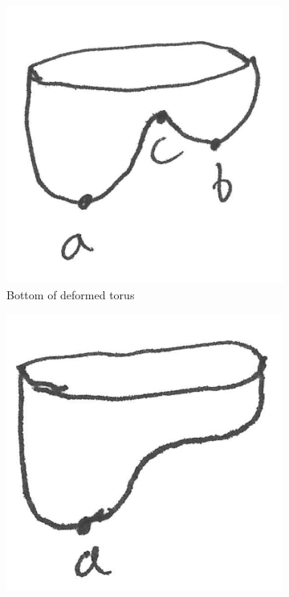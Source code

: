 \documentclass{article}
\begin{document}
\begin{figure}
	\centering
	\begin{subfigure}{0.24\columnwidth}
		\centering
		\includegraphics[width=\textwidth]{fig/blobby-torus-bottom}
		\caption{Bottom of deformed torus}
	\end{subfigure}
	\begin{subfigure}{0.24\columnwidth}
		\centering
		\includegraphics[width=\textwidth]{fig/blobby-torus-bottom-reduced1}

\end{subfigure}
\end{figure}
\end{document}
